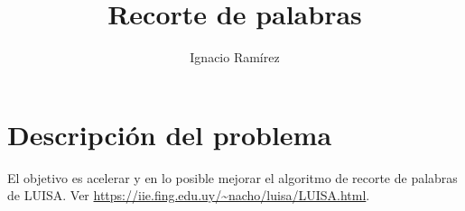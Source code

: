 \documentclass[11pt,a4paper]{article}
\author{Ignacio Ramírez}
\title{Recorte de palabras}
\begin{document}
\maketitle


\section{Descripción del problema}
El objetivo es acelerar y en lo posible mejorar el algoritmo de recorte de palabras
de LUISA. Ver \url{https://iie.fing.edu.uy/~nacho/luisa/LUISA.html}.
\end{document}
